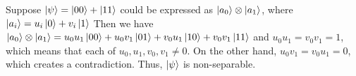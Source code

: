 \documentclass[all.tex]{subfiles}
\begin{document}
\ignorespaces
\parindent 0pt

\par Suppose $\ket{\psi} = \ket{00} + \ket{11}$ could be expressed as $\ket{a_0}
\otimes \ket{a_1}$, where $\ket{a_i} = u_i \ket{0} + v_i \ket{1}$ Then we have
$\ket{a_0} \otimes \ket{a_1} = u_0 u_1 \ket{00} + u_0 v_1 \ket{01} + v_0 u_1
\ket{10} + v_0 v_1 \ket{11}$ and $u_0 u_1 = v_0 v_1 = 1$, which means that each
of $u_0, u_1, v_0, v_1 \ne 0$. On the other hand, $u_0 v_1 = v_0 u_1 = 0$, which
creates a contradiction. Thus, $\ket{\psi}$ is non-separable.
\end{document}
